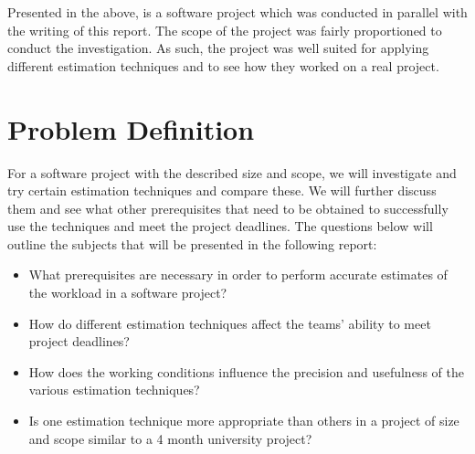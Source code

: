 Presented in the above, is a software project which was conducted in parallel with the writing of this report. The scope of the project was fairly proportioned to conduct the investigation. As such, the project was well suited for applying different estimation techniques and to see how they worked on a real project.


\section{Problem Definition}
For a software project with the described size and scope, we will investigate and try certain estimation techniques and compare these. We will further discuss them and see what other prerequisites that need to be obtained to successfully use the techniques and meet the project deadlines. The questions below will outline the subjects that will be presented in the following report:  
\begin{itemize}
\item What prerequisites are necessary in order to perform accurate estimates of the workload in a software project?
\item How do different estimation techniques affect the teams' ability to meet project deadlines?
\item How does the working conditions influence the precision and usefulness of the various estimation techniques?	
\item Is one estimation technique more appropriate than others in a project of size and scope similar to a 4 month university project?
\end{itemize}
\newpage

